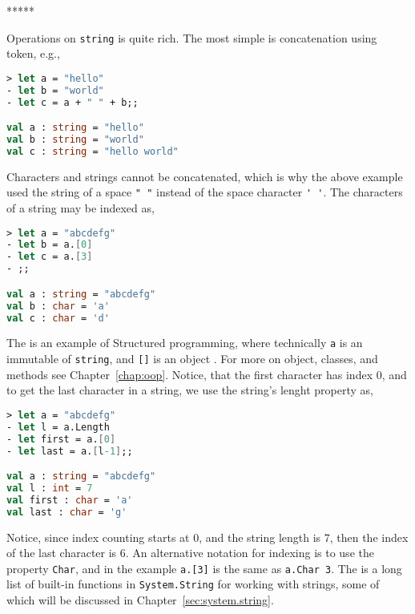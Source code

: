 *****

Operations on \lstinline{string} is quite rich. The most simple is concatenation using \token{+} token, e.g.,
%
\begin{lstlisting}[language=fsharp,caption={fsharpi, example of string concatenation.}]
> let a = "hello"      
- let b = "world"      
- let c = a + " " + b;;

val a : string = "hello"
val b : string = "world"
val c : string = "hello world"
\end{lstlisting}
%
Characters and strings cannot be concatenated, which is why the above example used the string of  a space \lstinline|" "| instead of the space character \lstinline|' '|. The characters of a string may be indexed as,
%
\begin{lstlisting}[language=fsharp,caption={fsharpi, example of string indexing.}]
> let a = "abcdefg"
- let b = a.[0]
- let c = a.[3]
- ;;

val a : string = "abcdefg"
val b : char = 'a'
val c : char = 'd'
\end{lstlisting}
%
The  is an example of Structured programming, where technically \lstinline|a| is an immutable  of  \lstinline|string|, and \lstinline|[]| is an object . For more on object, classes, and methods see Chapter~\ref{chap:oop}.  Notice, that the first character has index 0, and to get the last character in a string, we use the string's lenght property as,
%
\begin{lstlisting}[language=fsharp,caption={fsharpi, string length attribute and string indexing.}]
> let a = "abcdefg"                                                                             
- let l = a.Length                                                       
- let first = a.[0]
- let last = a.[l-1];;

val a : string = "abcdefg"
val l : int = 7
val first : char = 'a'
val last : char = 'g'
\end{lstlisting}
%
Notice, since index counting starts at 0, and the string length is 7, then the index of the last character is 6. An alternative notation for indexing is to use the property \lstinline|Char|, and in the example \lstinline|a.[3]| is the same as \lstinline|a.Char 3|. The is a long list of built-in functions in \lstinline|System.String| for working with strings, some of which will be discussed in Chapter~\ref{sec:system.string}.

